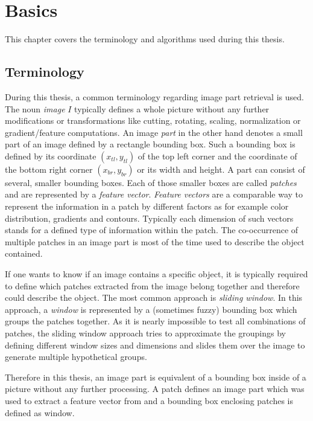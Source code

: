 \chapter{Basics}

This chapter covers the terminology and algorithms used during this thesis. 

\section{Terminology}
\label{sec:basic:terminology}

During this thesis, a common terminology regarding image part retrieval is used. The noun \textit{image} $I$ typically defines a whole picture without any further modifications or transformations like cutting, rotating, scaling, normalization or gradient/feature computations. An image \textit{part} in the other hand denotes a small part of an image defined by a rectangle bounding box. Such a bounding box is defined by its coordinate $(x_{tl},y_{tl})$ of the top left corner and the coordinate of the bottom right corner $(x_{br},y_{br})$ or its width and height. A part can consist of several, smaller bounding boxes. Each of those smaller boxes are called \textit{patches} and are represented by a \textit{feature vector}. \textit{Feature vectors} are a comparable way to represent the information in a patch by different factors as for example color distribution, gradients and contours. Typically each dimension of such vectors stands for a defined type of information within the patch. The co-occurrence of multiple patches in an image part is most of the time used to describe the object contained.

If one wants to know if an image contains a specific object, it is typically required to define which patches extracted from the image belong together and therefore could describe the object. The most common approach is \textit{sliding window}. In this approach, a \textit{window} is represented by a (sometimes fuzzy) bounding box which groups the patches together. As it is nearly impossible to test all combinations of patches, the sliding window approach tries to approximate the groupings by defining different window sizes and dimensions and slides them over the image to generate multiple hypothetical groups.

Therefore in this thesis, an image part is equivalent of a bounding box inside of a picture without any further processing. A patch defines an image part which was used to extract a feature vector from and a bounding box enclosing patches is defined as window.
\bigskip


